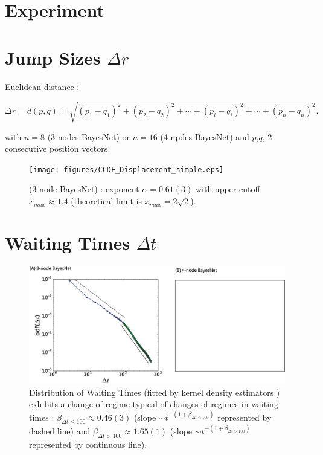 

\section{Experiment}
\label{si:experiment}

\section{Jump Sizes $\Delta r$}

Euclidean distance : 

\begin{equation}
\Delta r = d(p, q) = \sqrt{(p_1- q_1)^2 + (p_2 - q_2)^2+\cdots+(p_i - q_i)^2+\cdots+(p_n - q_n)^2}.
\end{equation}

with $n=8$ (3-nodes BayesNet) or $n=16$ (4-npdes BayesNet) and $p$,$q$, 2 consecutive position vectors

\begin{figure}[h!]
\begin{center}
\texttt{[image: figures/CCDF\_Displacement\_simple.eps]}
\caption{(3-node BayesNet) : exponent $\alpha = 0.61(3)$ with upper cutoff  $x_{max} \approx 1.4$ (theoretical limit is $x_{max} = 2\sqrt{2}$).}
\label{fig:jump_sizes}
\end{center}
\end{figure}


\section{Waiting Times $\Delta t$}



\begin{figure}[h!]
\begin{center}
\includegraphics[width=15cm]{figures/dt_kernel_SI.eps}
\caption{Distribution of Waiting Times (fitted by kernel density estimators \cite{}) exhibits a change of regime typical of changes of regimes in waiting times \cite{maillart2011,saichevTheory}: $\beta_{\Delta t  \leqslant 100} \approx 0.46(3)$ (slope $\sim t^{-(1+ \beta_{\Delta t  \leqslant 100})}$ represented by dashed line) and $\beta_{\Delta t > 100} \approx 1.65(1)$ (slope $\sim t^{-(1+ \beta_{\Delta t  > 100})}$ represented by continuous line).}
\label{fig:waiting_times}
\end{center}
\end{figure}


